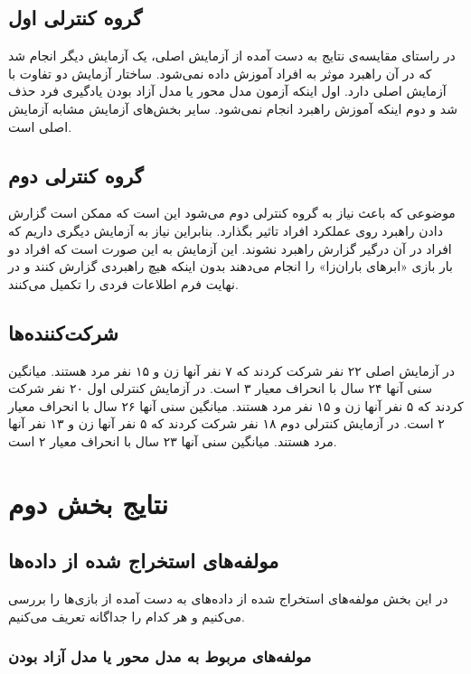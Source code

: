 \documentclass[twoside, a4paper,11pt]{book}
\numberwithin{equation}{chapter}
\numberwithin{table}{chapter}
\numberwithin{figure}{chapter}
\numberwithin{equation}{chapter}
\begin{document}
\subsection{گروه کنترلی اول}

در راستای مقایسه‌ی نتایج به دست آمده از آزمایش اصلی، یک آزمایش دیگر انجام شد که در آن راهبرد موثر به افراد آموزش داده نمی‌شود. ساختار آزمایش دو تفاوت با آزمایش اصلی دارد. اول اینکه آزمون مدل محور یا مدل آزاد بودن یادگیری فرد حذف شد و دوم اینکه آموزش راهبرد انجام نمی‌شود. سایر بخش‌های آزمایش مشابه آزمایش اصلی است.

\subsection{گروه کنترلی دوم}

موضوعی که باعث نیاز به گروه کنترلی دوم می‌شود این است که ممکن است گزارش دادن راهبرد روی عملکرد افراد تاثیر بگذارد. بنابراین نیاز به آزمایش دیگری داریم که افراد در آن درگیر گزارش راهبرد نشوند. این آزمایش به این صورت است که افراد دو بار بازی «ابرهای باران‌زا» را انجام می‌دهند بدون اینکه هیچ راهبردی گزارش کنند و در نهایت فرم اطلاعات فردی را تکمیل می‌کنند.

\subsection{شرکت‌کننده‌ها}

در آزمایش اصلی ۲۲ نفر شرکت کردند که ۷ نفر آنها زن و ۱۵ نفر مرد هستند. میانگین سنی آنها ۲۴ سال با انحراف معیار ۳ است. در آزمایش کنترلی اول ۲۰ نفر شرکت کردند که ۵ نفر آنها زن و ۱۵ نفر مرد هستند. میانگین سنی آنها ۲۶ سال با انحراف معیار ۲ است. در آزمایش کنترلی دوم ۱۸ نفر شرکت کردند که ۵ نفر آنها زن و ۱۳ نفر آنها مرد هستند. میانگین سنی آنها ۲۳ سال با انحراف معیار ۲ است.

\section{نتایج بخش دوم}

\subsection{مولفه‌های استخراج شده از داده‌ها}
در این بخش مولفه‌های استخراج شده از داده‌های به دست آمده از بازی‌ها را بررسی می‌کنیم و هر کدام را جداگانه تعریف می‌کنیم.
\subsubsection{مولفه‌های مربوط به مدل محور یا مدل آزاد بودن}
\end{document}
